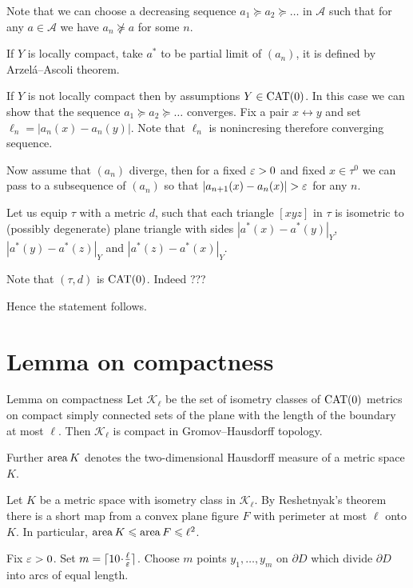 \documentclass[a4paper,10pt]{amsart}
\begin{document}
Note that we can choose a decreasing sequence 
$a_1
\succcurlyeq
a_2
\succcurlyeq
\dots $
in $\mathcal{A}$ such that for any $a\in \mathcal{A}$
we have $a_n\not\succcurlyeq a$ for some $n$.

If $Y$ is locally compact, 
take $a^*$ to be partial limit of $(a_n)$,
it is defined by Arzel\'a--Ascoli theorem.

If $Y$ is not locally compact then by assumptions $Y\in\mathop{\rm CAT}\nolimits(0)$.
In this case we can show that the sequence $a_1\succcurlyeq a_2\succcurlyeq\dots $ converges.
Fix a pair $x\leftrightarrow y$ and set $\ell_n=|a_n(x)-a_n(y)|$.
Note that $\ell_n$ is nonincresing therefore converging sequence.

Now assume that $(a_n)$ diverge,
then for a fixed $\varepsilon>0$ and fixed  $x\in\tau^{0}$
we can pass to a subsequence of $(a_n)$ so that
$|a_{n+1}(x)-a_{n}(x)|>\eps$ for any $n$.

Let us equip $\tau$ with a metric $d$,
such that each triangle $[xyz]$ in $\tau$ is isometric to (possibly degenerate) plane triangle with sides $|a^*(x)-a^*(y)|_Y$,
$|a^*(y)-a^*(z)|_Y$ and  $|a^*(z)-a^*(x)|_Y$.

Note that $(\tau,d)$ is $\mathop{\rm CAT}\nolimits(0)$.
Indeed ???

Hence the statement follows.
\qeds



\section{Lemma on compactness}

\begin{thm}{Lemma on compactness}\label{lem:compact}
Let $\mathcal{K}_\ell$ be the set of isometry classes of $\mathop{\rm CAT}\nolimits(0)$ metrics on compact simply connected sets of the plane 
with the length of the boundary at most $\ell$.
Then $\mathcal{K}_\ell$ is compact in Gromov--Hausdorff topology.
\end{thm}

Further $\mathop{\rm area}\nolimits K$ denotes the two-dimensional Hausdorff measure of a metric space $K$. 

Let $K$ be a metric space with isometry class in $\mathcal {K}_\ell$.
By Reshetnyak's theorem there is a short map from a convex plane figure $F$ with perimeter at most $\ell$ onto $K$.
In particular, $\mathop{\rm area}\nolimits K \leqslant \mathop{\rm area}\nolimits F 
\leqslant \ell^2$.

Fix $\varepsilon>0$. 
Set $m=\lceil 10\cdot\tfrac\ell\eps\rceil$.
Choose $m$ points $y_1,\dots,y_m$ on $\partial D$
which divide $\partial D$ into arcs of equal length.
\end{document}

